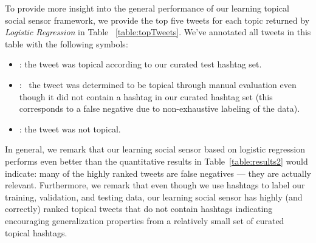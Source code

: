 To provide more insight into the general performance of our learning
topical social sensor framework, we provide the top five tweets for
each topic returned by \textit{Logistic Regression} in Table
~\ref{table:topTweets}.  We've annotated all tweets in this table with
the following symbols:
\begin{itemize}
\item \checkmark: \; the tweet was topical according to our curated test hashtag set.
\item \starmark:\ \; the tweet was determined to be topical through manual evaluation
even though it did not contain a hashtag in our curated hashtag set (this corresponds
to a false negative due to non-exhaustive labeling of the data).
\item \xmark: \; the tweet was not topical.
\end{itemize}  
In general, we remark that our learning social sensor based on
logistic regression performs even better than the quantitative results
in Table~\ref{table:results2} would indicate: many of the highly
ranked tweets are false negatives --- they are actually relevant.
Furthermore, we remark that even though we use hashtags to label our
training, validation, and testing data, our learning social sensor has
highly (and correctly) ranked topical tweets that do not contain
hashtags indicating encouraging generalization properties from a
relatively small set of curated topical hashtags.



